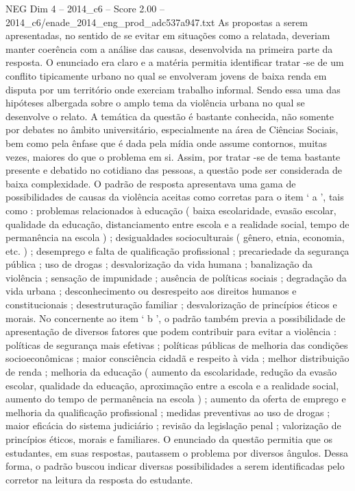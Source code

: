 \begin{textsample}{NEG Dim 4 – 2014\_c6 – Score 2.00 – 2014\_c6/enade\_2014\_eng\_prod\_adc537a947.txt}
As propostas a serem apresentadas, no sentido de se evitar em situações como a relatada, deveriam manter coerência com a análise das causas, desenvolvida na primeira parte da resposta.
O enunciado era claro e a matéria permitia identificar tratar -se de um conflito tipicamente urbano no qual se envolveram jovens de baixa renda em disputa por um território onde exerciam trabalho informal.
Sendo essa uma das hipóteses albergada sobre o amplo tema da violência urbana no qual se desenvolve o relato.
A temática da questão é bastante conhecida, não somente por debates no âmbito universitário, especialmente na área de Ciências Sociais, bem como pela ênfase que é dada pela mídia onde assume contornos, muitas vezes, maiores do que o problema em si.
Assim, por tratar -se de tema bastante presente e debatido no cotidiano das pessoas, a questão pode ser considerada de baixa complexidade.
O padrão de resposta apresentava uma gama de possibilidades de causas da violência aceitas como corretas para o item ‘ a ’, tais como : problemas relacionados à educação ( baixa escolaridade, evasão escolar, qualidade da educação, distanciamento entre escola e a realidade social, tempo de permanência na escola ) ; desigualdades socioculturais ( gênero, etnia, economia, etc. ) ; desemprego e falta de qualificação profissional ; precariedade da segurança pública ; uso de drogas ; desvalorização da vida humana ; banalização da violência ; sensação de impunidade ; ausência de políticas sociais ; degradação da vida urbana ; desconhecimento ou desrespeito aos direitos humanos e constitucionais ; desestruturação familiar ; desvalorização de princípios éticos e morais.
No concernente ao item ‘ b ’, o padrão também previa a possibilidade de apresentação de diversos fatores que podem contribuir para evitar a violência : políticas de segurança mais efetivas ; políticas públicas de melhoria das condições socioeconômicas ; maior consciência cidadã e respeito à vida ; melhor distribuição de renda ; melhoria da educação ( aumento da escolaridade, redução da evasão escolar, qualidade da educação, aproximação entre a escola e a realidade social, aumento do tempo de permanência na escola ) ; aumento da oferta de emprego e melhoria da qualificação profissional ; medidas preventivas ao uso de drogas ; maior eficácia do sistema judiciário ; revisão da legislação penal ; valorização de princípios éticos, morais e familiares.
O enunciado da questão permitia que os estudantes, em suas respostas, pautassem o problema por diversos ângulos.
Dessa forma, o padrão buscou indicar diversas possibilidades a serem identificadas pelo corretor na leitura da resposta do estudante.

\end{textsample}
